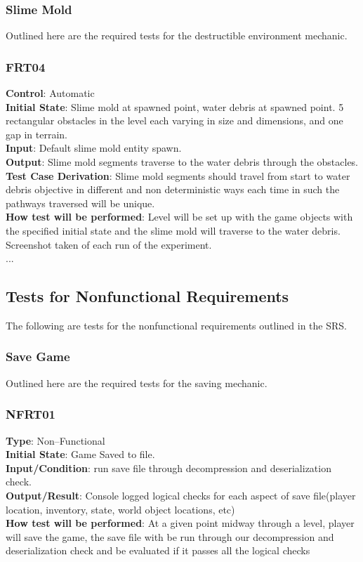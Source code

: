\documentclass[12pt, titlepage]{article}
\begin{document}
\subsubsection{Slime Mold}

Outlined here are the required tests for the destructible environment mechanic.

\subsubsection{FRT04}

\textbf{Control}: Automatic\\
\textbf{Initial State}: Slime mold at spawned point, water debris at spawned point. 5 rectangular obstacles in the level each varying in size and dimensions, and one gap in terrain.\\
\textbf{Input}: Default slime mold entity spawn.\\
\textbf{Output}: Slime mold segments traverse to the water debris through the obstacles.\\
\textbf{Test Case Derivation}: Slime mold segments should travel from start to water debris objective in different and non deterministic ways each time in such the pathways traversed will be unique.\\
\textbf{How test will be performed}: Level will be set up with the game objects with  the specified initial state and the slime mold will traverse to the water debris. Screenshot taken of each run of the experiment.\\
...

\subsection{Tests for Nonfunctional Requirements}

The following are tests for the nonfunctional requirements outlined in the SRS.

\subsubsection{Save Game}

Outlined here are the required tests for the saving mechanic.

\subsubsection{NFRT01}

\textbf{Type}: Non--Functional\\
\textbf{Initial State}: Game Saved to file.\\
\textbf{Input/Condition}: run save file through decompression and deserialization check.\\
\textbf{Output/Result}: Console logged logical checks for each aspect of save file(player location, inventory, state, world object locations, etc)\\
\textbf{How test will be performed}: At a given point midway through a level, player will save the game, the save file with be run through our decompression and deserialization check and be evaluated if it passes all the logical checks\\
\end{document}

